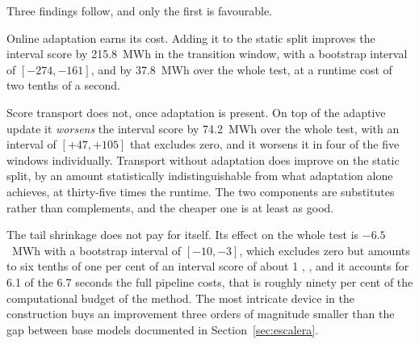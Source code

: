 \documentclass[preprint,3p,times]{elsarticle}
\providecommand{\DIFaddtex}[1]{{\protect\color{blue} \sf #1}} %
\providecommand{\DIFaddFL}[1]{\DIFadd{#1}} %
\providecommand{\DIFadd}[1]{\texorpdfstring{\DIFaddtex{#1}}{#1}} %
\begin{document}
\DIFaddFL{Three findings follow, and only the first is favourable.
}

\DIFaddFL{Online adaptation earns its cost. Adding it to the static split improves the interval score by 215.8~MWh in the transition window, with a bootstrap interval of $[-274,-161]$, and by 37.8~MWh over the whole test, at a runtime cost of two tenths of a second.
}

\DIFaddFL{Score transport does not, once adaptation is present. On top of the adaptive update it \emph{worsens} the interval score by 74.2~MWh over the whole test, with an interval of $[+47,+105]$ that excludes zero, and it worsens it in four of the five windows individually. Transport without adaptation does improve on the static split, by an amount statistically indistinguishable from what adaptation alone achieves, at thirty-five times the runtime. The two components are substitutes rather than complements, and the cheaper one is at least as good.
}

\DIFaddFL{The tail shrinkage does not pay for itself. Its effect on the whole test is $-6.5$~MWh with a bootstrap interval of $[-10,-3]$, which excludes zero but amounts to six tenths of one per cent of an interval score of about 1}{\DIFaddFL{,}}\DIFaddFL{030, and it accounts for 6.1 of the 6.7 seconds the full pipeline costs, that is roughly ninety per cent of the computational budget of the method. The most intricate device in the construction buys an improvement three orders of magnitude smaller than the gap between base models documented in Section~\ref{sec:escalera}.
}
\end{document}
